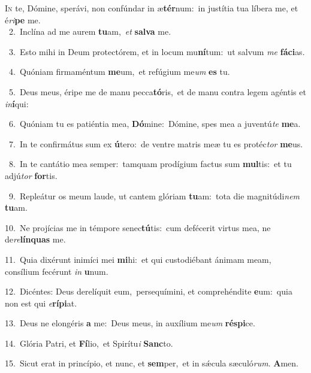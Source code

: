 \lettrine{\initial\textcolor{\initialcolor}{I}}{n} te, Dómine, sperávi, non confúndar in æ\-\textbf{tér}\-num:~\star in justítia tua líbera me, et é\-\textit{ri}\-\textbf{pe} me.\\
{\numbfont\textcolor{\numbcolor}{~2.}}~Inclína ad me aurem \textbf{tu}\-am,~\star \textit{et} \textbf{sal}\-\textbf{va} me.\par
{\numbfont\textcolor{\numbcolor}{~3.}}~Esto mihi in Deum protectórem, et in locum mu\-\textbf{ní}\-tum:~\star ut salvum \textit{me} \textbf{fá}\-\textbf{ci}as.\par
{\numbfont\textcolor{\numbcolor}{~4.}}~Quóniam firmaméntum \textbf{me}\-um,~\star et refúgium me\textit{um} \textbf{es} tu.\par
{\numbfont\textcolor{\numbcolor}{~5.}}~Deus meus, éripe me de manu pecca\-\textbf{tó}\-ris,~\star et de manu contra legem agéntis et \textit{in}\-\textbf{í}qui:\par
{\numbfont\textcolor{\numbcolor}{~6.}}~Quóniam tu es patiéntia mea, \textbf{Dó}\-mine:~\star Dómine, spes mea a juventú\textit{te} \textbf{me}\-a.\par
{\numbfont\textcolor{\numbcolor}{~7.}}~In te confirmátus sum ex \textbf{ú}\-tero:~\star de ventre matris meæ tu es protéc\textit{tor} \textbf{me}\-us.\par
{\numbfont\textcolor{\numbcolor}{~8.}}~In te cantátio mea semper:~\dagger tamquam prodígium factus sum \textbf{mul}\-tis:~\star et tu adjú\textit{tor} \textbf{for}\-tis.\par
{\numbfont\textcolor{\numbcolor}{~9.}}~Repleátur os meum laude, ut cantem glóriam \textbf{tu}\-am:~\star tota die magnitúdi\textit{nem} \textbf{tu}\-am.\par
{\numbfont\textcolor{\numbcolor}{10.}}~Ne projícias me in témpore senec\-\textbf{tú}\-tis:~\star cum defécerit virtus mea, ne de\-\textit{re}\-\textbf{lín}\textbf{quas} me.\par
{\numbfont\textcolor{\numbcolor}{11.}}~Quia dixérunt inimíci mei \textbf{mi}\-hi:~\star et qui custodiébant ánimam meam, consílium fecérunt \textit{in} \textbf{u}\-num.\par
{\numbfont\textcolor{\numbcolor}{12.}}~Dicéntes: Deus derelíquit eum,~\dagger persequímini, et comprehéndite \textbf{e}\-um:~\star quia non est qui \textit{e}\-\textbf{rí}\textbf{pi}at.\par
{\numbfont\textcolor{\numbcolor}{13.}}~Deus ne elongéris \textbf{a} me:~\star Deus meus, in auxílium me\textit{um} \textbf{ré}\-\textbf{spi}ce.\par
{\numbfont\textcolor{\numbcolor}{14.}}~Glória Patri, et \textbf{Fí}\-lio,~\star et Spirítu\textit{i} \textbf{Sanc}\-to.\par
{\numbfont\textcolor{\numbcolor}{15.}}~Sicut erat in princípio, et nunc, et \textbf{sem}\-per,~\star et in sǽcula sæculó\-\textit{rum}\-. \textbf{A}\-men.\par
